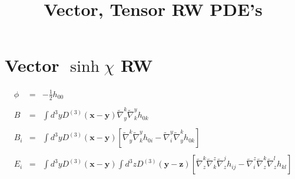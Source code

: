 \documentclass[10pt,letterpaper]{article}
\title{Vector, Tensor RW PDE's}
\date{}
\numberwithin{equation}{section}
\begin{document}
 
\maketitle
\noindent 
\section{ Vector $\sinh\chi$ RW }
\begin{eqnarray}
\phi &=& -\frac12 h_{00}
\\ \nonumber\\
B &=& \int d^3y D^{(3)}(\mathbf x - \mathbf y) \tilde\nabla^k_y \tilde\nabla_k^y h_{0k}
\\ \nonumber\\
B_i &=& \int d^3y D^{(3)}(\mathbf x - \mathbf y)\left[ \tilde\nabla^k_y \tilde\nabla_k^y h_{0i}
- \tilde\nabla_i^y \tilde\nabla^k_y h_{0k} \right]
\\ \nonumber\\
E_i &=& \int d^3y D^{(3)}(\mathbf x - \mathbf y) \int d^3z D^{(3)}(\mathbf y - \mathbf z)
\left[ \tilde\nabla^k_z \tilde\nabla_k^z \tilde\nabla^j_z h_{ij}-\tilde\nabla_i^z \tilde\nabla^k_z \tilde\nabla^l_z h_{kl} \right]
\end{eqnarray}
\end{document}
